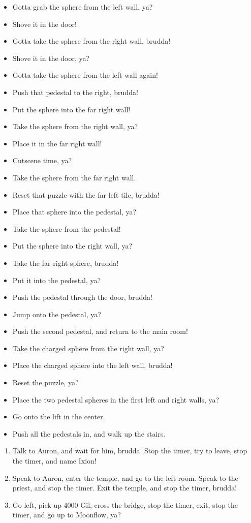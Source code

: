 \begin{trial}
\begin{itemize}
\item Gotta grab the sphere from the left wall, ya?
\item Shove it in the door!
\item Gotta take the sphere from the right wall, brudda!
\item Shove it in the door, ya?
\item Gotta take the sphere from the left wall again!
\item Push that pedestal to the right, brudda!
\item Put the sphere into the far right wall!
\item Take the sphere from the right wall, ya?
\item Place it in the far right wall!
\item Cutscene time, ya?
\item Take the sphere from the far right wall.
\item Reset that puzzle with the far left tile, brudda!
\item Place that sphere into the pedestal, ya?
\item Take the sphere from the pedestal!
\item Put the sphere into the right wall, ya?
\item Take the far right sphere, brudda!
\item Put it into the pedestal, ya?
\item Push the pedestal through the door, brudda!
\item Jump onto the pedestal, ya?
\item Push the second pedestal, and return to the main room!
\item Take the charged sphere from the right wall, ya?
\item Place the charged sphere into the left wall, brudda!
\item Reset the puzzle, ya?
\item Place the two pedestal spheres in the first left and right walls, ya?
\item Go onto the lift in the center.
\item Push all the pedestals in, and walk up the stairs.
\end{itemize}
\end{trial}
\begin{enumerate}[resume]
\item Talk to Auron, and wait for him, brudda. Stop the timer, try to leave, stop the timer, and name Ixion!
\item Speak to Auron, enter the temple, and go to the left room. Speak to the priest, and stop the timer. Exit the temple, and stop the timer, brudda!
\item Go left, pick up 4000 Gil, cross the bridge, stop the timer, exit, stop the timer, and go up to Moonflow, ya?
\end{enumerate}
\wincb\losscb\bothcb